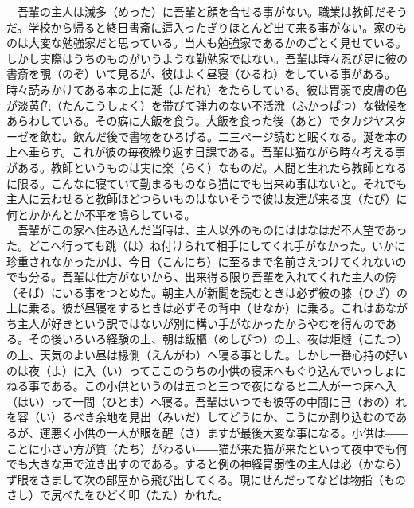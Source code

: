 \documentclass{book}
\begin{document}
　吾輩の主人は滅多（めった）に吾輩と顔を合せる事がない。職業は教師だそうだ。学校から帰ると終日書斎に這入ったぎりほとんど出て来る事がない。家のものは大変な勉強家だと思っている。当人も勉強家であるかのごとく見せている。しかし実際はうちのものがいうような勤勉家ではない。吾輩は時々忍び足に彼の書斎を覗（のぞ）いて見るが、彼はよく昼寝（ひるね）をしている事がある。時々読みかけてある本の上に涎（よだれ）をたらしている。彼は胃弱で皮膚の色が淡黄色（たんこうしょく）を帯びて弾力のない不活溌（ふかっぱつ）な徴候をあらわしている。その癖に大飯を食う。大飯を食った後（あと）でタカジヤスターゼを飲む。飲んだ後で書物をひろげる。二三ページ読むと眠くなる。涎を本の上へ垂らす。これが彼の毎夜繰り返す日課である。吾輩は猫ながら時々考える事がある。教師というものは実に楽（らく）なものだ。人間と生れたら教師となるに限る。こんなに寝ていて勤まるものなら猫にでも出来ぬ事はないと。それでも主人に云わせると教師ほどつらいものはないそうで彼は友達が来る度（たび）に何とかかんとか不平を鳴らしている。\\
　吾輩がこの家へ住み込んだ当時は、主人以外のものにははなはだ不人望であった。どこへ行っても跳（は）ね付けられて相手にしてくれ手がなかった。いかに珍重されなかったかは、今日（こんにち）に至るまで名前さえつけてくれないのでも分る。吾輩は仕方がないから、出来得る限り吾輩を入れてくれた主人の傍（そば）にいる事をつとめた。朝主人が新聞を読むときは必ず彼の膝（ひざ）の上に乗る。彼が昼寝をするときは必ずその背中（せなか）に乗る。これはあながち主人が好きという訳ではないが別に構い手がなかったからやむを得んのである。その後いろいろ経験の上、朝は飯櫃（めしびつ）の上、夜は炬燵（こたつ）の上、天気のよい昼は椽側（えんがわ）へ寝る事とした。しかし一番心持の好いのは夜（よ）に入（い）ってここのうちの小供の寝床へもぐり込んでいっしょにねる事である。この小供というのは五つと三つで夜になると二人が一つ床へ入（はい）って一間（ひとま）へ寝る。吾輩はいつでも彼等の中間に己（おの）れを容（い）るべき余地を見出（みいだ）してどうにか、こうにか割り込むのであるが、運悪く小供の一人が眼を醒（さ）ますが最後大変な事になる。小供は――ことに小さい方が質（たち）がわるい――猫が来た猫が来たといって夜中でも何でも大きな声で泣き出すのである。すると例の神経胃弱性の主人は必（かなら）ず眼をさまして次の部屋から飛び出してくる。現にせんだってなどは物指（ものさし）で尻ぺたをひどく叩（たた）かれた。\\
\end{document}
